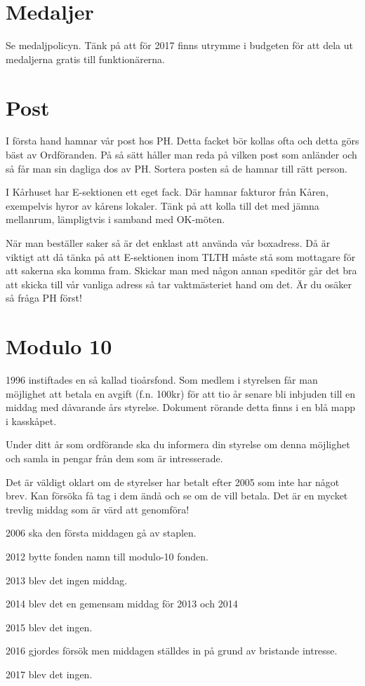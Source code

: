 \documentclass[10pt]{article}
\begin{document}
\section{Medaljer}

Se medaljpolicyn. Tänk på att för 2017 finns utrymme i budgeten för att dela ut medaljerna gratis till funktionärerna.

\section{Post}

I första hand hamnar vår post hos PH. Detta facket bör kollas ofta och detta görs bäst av Ordföranden. På så sätt håller man reda på vilken post som anländer och så får man sin dagliga dos av PH. Sortera posten så de hamnar till rätt person.

I Kårhuset har E-sektionen ett eget fack. Där hamnar fakturor från Kåren, exempelvis hyror av kårens lokaler. Tänk på att kolla till det med jämna mellanrum, lämpligtvis i samband med OK-möten.

När man beställer saker så är det enklast att använda vår boxadress. Då är viktigt att då tänka på att E-sektionen inom TLTH måste stå som mottagare för att sakerna ska komma fram. Skickar man med någon annan speditör går det bra att skicka till vår vanliga adress så tar vaktmästeriet hand om det. Är du osäker så fråga PH först!

\section{Modulo 10}

1996 instiftades en så kallad tioårsfond. Som medlem i styrelsen får man möjlighet att betala en avgift (f.n. 100kr) för att tio år senare bli inbjuden till en middag med dåvarande års styrelse. Dokument rörande detta finns i en blå mapp i kasskåpet.

Under ditt år som ordförande ska du informera din styrelse om denna möjlighet och samla in pengar från dem som är intresserade.

Det är väldigt oklart om de styrelser har betalt efter 2005 som inte har något brev. Kan försöka få tag i dem ändå och se om de vill betala. Det är en mycket trevlig middag som är värd att genomföra!

\begin{dashlist}
\item 2006 ska den första middagen gå av staplen.
\item 2012 bytte fonden namn till modulo-10 fonden.
\item 2013 blev det ingen middag.
\item 2014 blev det en gemensam middag för 2013 och 2014
\item 2015 blev det ingen.
\item 2016 gjordes försök men middagen ställdes in på grund av bristande intresse.
\item 2017 blev det ingen.
\end{dashlist}
\end{document}
